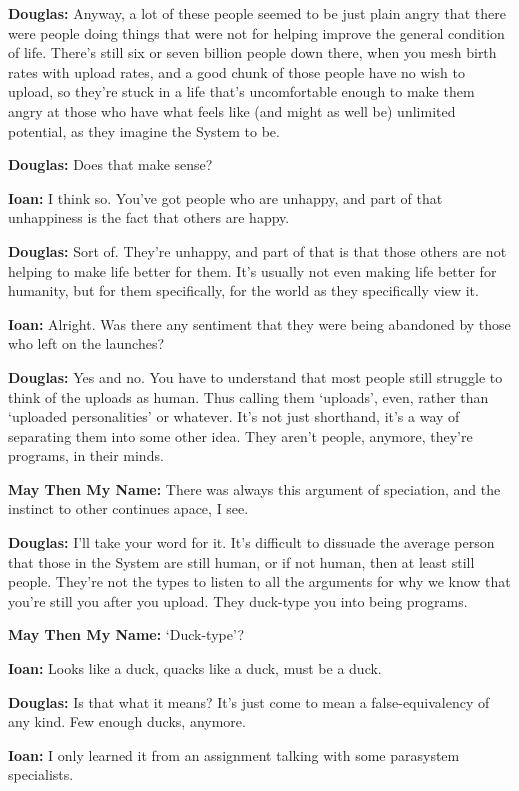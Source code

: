 \textbf{Douglas:} Anyway, a lot of these people seemed to be just plain angry that there were people doing things that were not for helping improve the general condition of life. There's still six or seven billion people down there, when you mesh birth rates with upload rates, and a good chunk of those people have no wish to upload, so they're stuck in a life that's uncomfortable enough to make them angry at those who have what feels like (and might as well be) unlimited potential, as they imagine the System to be.

\textbf{Douglas:} Does that make sense?

\textbf{Ioan:} I think so. You've got people who are unhappy, and part of that unhappiness is the fact that others are happy.

\textbf{Douglas:} Sort of. They're unhappy, and part of that is that those others are not helping to make life better for them. It's usually not even making life better for humanity, but for them specifically, for the world as they specifically view it.

\textbf{Ioan:} Alright. Was there any sentiment that they were being abandoned by those who left on the launches?

\textbf{Douglas:} Yes and no. You have to understand that most people still struggle to think of the uploads as human. Thus calling them `uploads', even, rather than `uploaded personalities' or whatever. It's not just shorthand, it's a way of separating them into some other idea. They aren't people, anymore, they're programs, in their minds.

\textbf{May Then My Name:} There was always this argument of speciation, and the instinct to other continues apace, I see.

\textbf{Douglas:} I'll take your word for it. It's difficult to dissuade the average person that those in the System are still human, or if not human, then at least still people. They're not the types to listen to all the arguments for why we know that you're still you after you upload. They duck-type you into being programs.

\textbf{May Then My Name:} `Duck-type'?

\textbf{Ioan:} Looks like a duck, quacks like a duck, must be a duck.

\textbf{Douglas:} Is that what it means? It's just come to mean a false-equivalency of any kind. Few enough ducks, anymore.

\textbf{Ioan:} I only learned it from an assignment talking with some parasystem specialists.

